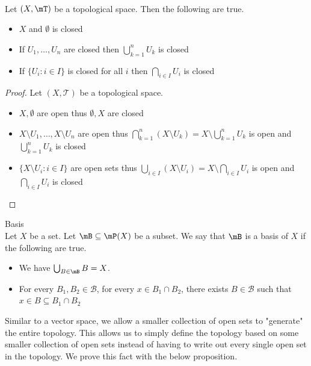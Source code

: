 \documentclass[a4paper]{article}
\begin{document}
\begin{prp}{}{}\\
Let $(X,\mT)$ be a topological space. Then the following are true. 
\begin{itemize}
\item $X$ and $\emptyset$ is closed
\item If $U_1,\dots,U_n$ are closed then $\bigcup_{k=1}^nU_k$ is closed
\item If $\{U_i:i\in I\}$ is closed for all $i$ then $\bigcap_{i\in I}U_i$ is closed
\end{itemize}
\begin{proof}
Let $(X,\mathcal{T})$ be a topological space. 
\begin{itemize}
\item $X,\emptyset$ are open thus $\emptyset,X$ are closed
\item $X\setminus U_1,\dots,X\setminus U_n$ are open thus $\bigcap_{k=1}^n(X\setminus U_k)=X\setminus\bigcup_{k=1}^nU_k$ is open and $\bigcup_{k=1}^nU_k$ is closed
\item $\{X\setminus U_i:i\in I\}$ are open sets thus $\bigcup_{i\in I}(X\setminus U_i)=X\setminus\bigcap_{i\in I}U_i$ is open and $\bigcap_{i\in I}U_i$ is closed
\end{itemize}
\end{proof}
\end{prp}

\begin{defn}{Basis}{}\\
Let $X$ be a set. Let $\mB\subseteq\mP(X)$ be a subset. We say that $\mB$ is a basis of $X$ if the following are true. 
\begin{itemize}
\item We have $\bigcup_{B\in\mB}B=X$. 
\item For every $B_1,B_2\in\mathcal{B}$, for every $x\in B_1\cap B_2$, there exists $B\in\mathcal{B}$ such that $x\in B\subseteq B_1\cap B_2$
\end{itemize}
\end{defn}

Similar to a vector space, we allow a smaller collection of open sets to "generate" the entire topology. This allows us to simply define the topology based on some smaller collection of open sets instead of having to write out every single open set in the topology. We prove this fact with the below proposition. 
\end{document}
